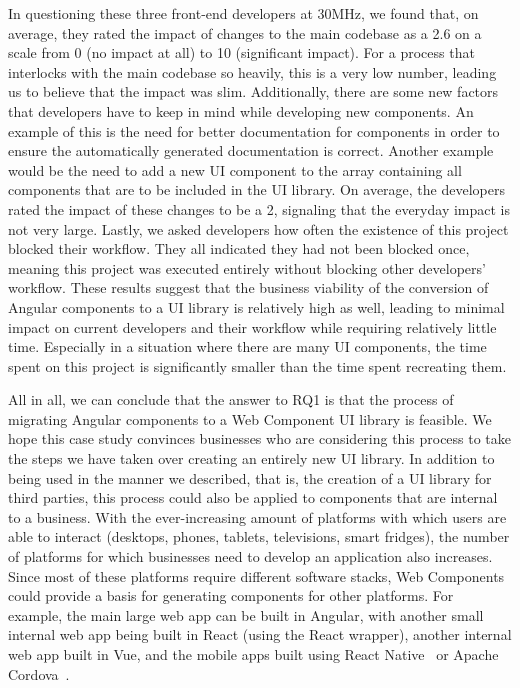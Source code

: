 In questioning these three front-end developers at 30MHz, we found that, on average, they rated the impact of changes to the main codebase as a 2.6 on a scale from 0 (no impact at all) to 10 (significant impact). For a process that interlocks with the main codebase so heavily, this is a very low number, leading us to believe that the impact was slim.
Additionally, there are some new factors that developers have to keep in mind while developing new components. An example of this is the need for better documentation for components in order to ensure the automatically generated documentation is correct. Another example would be the need to add a new UI component to the array containing all components that are to be included in the UI library. On average, the developers rated the impact of these changes to be a 2, signaling that the everyday impact is not very large. Lastly, we asked developers how often the existence of this project blocked their workflow. They all indicated they had not been blocked once, meaning this project was executed entirely without blocking other developers' workflow. These results suggest that the business viability of the conversion of Angular components to a UI library is relatively high as well, leading to minimal impact on current developers and their workflow while requiring relatively little time. Especially in a situation where there are many UI components, the time spent on this project is significantly smaller than the time spent recreating them.

All in all, we can conclude that the answer to RQ1 is that the process of migrating Angular components to a Web Component UI library is feasible. We hope this case study convinces businesses who are considering this process to take the steps we have taken over creating an entirely new UI library. In addition to being used in the manner we described, that is, the creation of a UI library for third parties, this process could also be applied to components that are internal to a business. With the ever-increasing amount of platforms with which users are able to interact (desktops, phones, tablets, televisions, smart fridges), the number of platforms for which businesses need to develop an application also increases. Since most of these platforms require different software stacks, Web Components could provide a basis for generating components for other platforms. For example, the main large web app can be built in Angular, with another small internal web app being built in React (using the React wrapper), another internal web app built in Vue, and the mobile apps built using React Native~ or Apache Cordova~.

